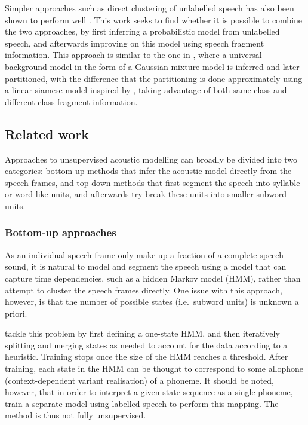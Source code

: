 Simpler approaches such as direct clustering of unlabelled speech has also been shown to perform well \parencite{chen2015parallel}.
This work seeks to find whether it is possible to combine the two approaches, by first inferring a probabilistic model from unlabelled speech, and afterwards improving on this model using speech fragment information.
This approach is similar to the one in \parencite{jansen2013weak}, where a universal background model in the form of a Gaussian mixture model is inferred and later partitioned, with the difference that the partitioning is done approximately using a linear siamese model inspired by \parencite{synnaeve2014phonetics}, taking advantage of both same-class and different-class fragment information.

\subsection{Related work}

Approaches to unsupervised acoustic modelling can broadly be divided into two categories: bottom-up methods that infer the acoustic model directly from the speech frames, and top-down methods that first segment the speech into syllable- or word-like units, and afterwards try break these units into smaller subword units.

\subsubsection{Bottom-up approaches}

As an individual speech frame only make up a fraction of a complete speech sound, it is natural to model and segment the speech using a model that can capture time dependencies, such as a hidden Markov model (HMM), rather than attempt to cluster the speech frames directly.
One issue with this approach, however, is that the number of possible states (i.e.\ subword units) is unknown a priori.

\textcite{varadarajan2008unsupervised} tackle this problem by first defining a one-state HMM, and then iteratively splitting and merging states as needed to account for the data according to a heuristic.
Training stops once the size of the HMM reaches a threshold.
After training, each state in the HMM can be thought to correspond to some allophone (context-dependent variant realisation) of a phoneme.
It should be noted, however, that in order to interpret a given state sequence as a single phoneme, \citeauthor{varadarajan2008unsupervised} train a separate model using labelled speech to perform this mapping.
The method is thus not fully unsupervised.

